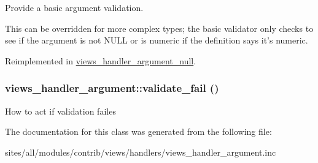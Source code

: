 Provide a basic argument validation.

This can be overridden for more complex types; the basic validator only checks to see if the argument is not NULL or is numeric if the definition says it's numeric. 

Reimplemented in \hyperlink{classviews__handler__argument__null_fc4fd62d96247a2ebebbd7e44f0742ce}{views\_\-handler\_\-argument\_\-null}.\hypertarget{classviews__handler__argument_c180c7b4e4f53bdf39272ac17591f13a}{
\subsubsection[{validate\_\-fail}]{\setlength{\rightskip}{0pt plus 5cm}views\_\-handler\_\-argument::validate\_\-fail ()}}
\label{classviews__handler__argument_c180c7b4e4f53bdf39272ac17591f13a}


How to act if validation failes 

The documentation for this class was generated from the following file:\begin{CompactItemize}
\item 
sites/all/modules/contrib/views/handlers/views\_\-handler\_\-argument.inc\end{CompactItemize}
